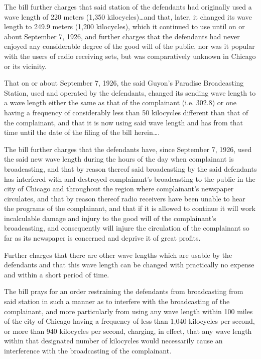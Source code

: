 The bill further charges that said station of the defendants had originally used
a wave length of 220 meters (1,350 kilocycles)\ldots and that, later, it
changed its wave length to 249.9 meters (1,200 kilocycles), which it continued
to use until on or about September 7, 1926, and further charges that the
defendants had never enjoyed any considerable degree of the good will of the
public, nor was it popular with the users of radio receiving sets, but was
comparatively unknown in Chicago or its vicinity.

That on or about September 7, 1926, the said Guyon's Paradise Broadcasting
Station, used and operated by the defendants, changed its sending wave length
to a wave length either the same as that of the complainant (i.e. 302.8) or one
having a frequency of considerably less than 50 kilocycles different than that
of the complainant, and that it is now using said wave length and has from that
time until the date of the filing of the bill herein\ldots.

The bill further charges that the defendants have, since September 7, 1926, used
the said new wave length during the hours of the day when complainant is
broadcasting, and that by reason thereof said broadcasting by the said
defendants has interfered with and destroyed complainant's broadcasting to the
public in the city of Chicago and throughout the region where complainant's
newspaper circulates, and that by reason thereof radio receivers have been
unable to hear the programs of the complainant, and that if it is allowed to
continue it will work incalculable damage and injury to the good will of the
complainant's broadcasting, and consequently will injure the circulation of the
complainant so far as its newspaper is concerned and deprive it of great
profits.

Further charges that there are other wave lengths which are usable by the
defendants and that this wave length can be changed with practically no expense
and within a short period of time.

The bill prays for an order restraining the defendants from broadcasting from
said station in such a manner as to interfere with the broadcasting of the
complainant, and more particularly from using any wave length within 100 miles
of the city of Chicago having a frequency of less than 1,040 kilocycles per
second, or more than 940 kilocycles per second, charging, in effect, that any
wave length within that designated number of kilocycles would necessarily cause
an interference with the broadcasting of the complainant. 

